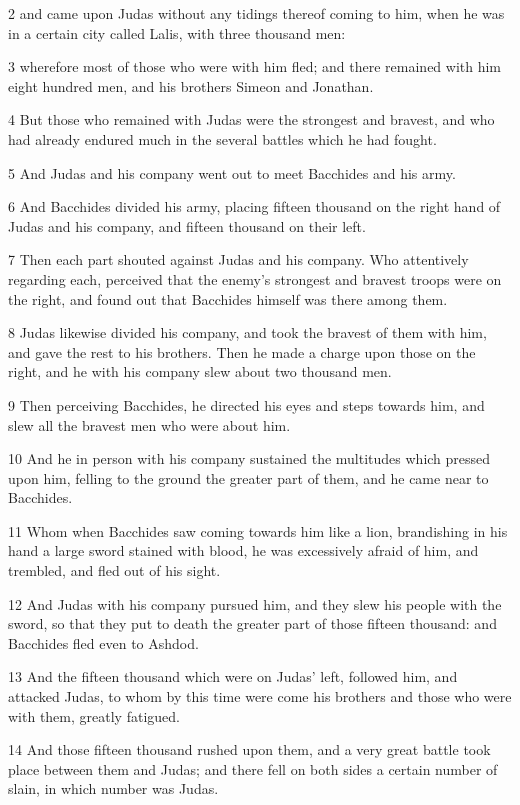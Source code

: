 2 and came upon Judas without any tidings thereof coming to him, when he was in a certain city called Lalis, with three thousand men: 

3 wherefore most of those who were with him fled; and there remained with him eight hundred men, and his brothers Simeon and Jonathan. 

4 But those who remained with Judas were the strongest and bravest, and who had already endured much in the several battles which he had fought. 

5 And Judas and his company went out to meet Bacchides and his army. 

6 And Bacchides divided his army, placing fifteen thousand on the right hand of Judas and his company, and fifteen thousand on their left. 

7 Then each part shouted against Judas and his company. Who attentively regarding each, perceived that the enemy’s strongest and bravest troops were on the right, and found out that Bacchides himself was there among them. 

8 Judas likewise divided his company, and took the bravest of them with him, and gave the rest to his brothers. Then he made a charge upon those on the right, and he with his company slew about two thousand men. 

9 Then perceiving Bacchides, he directed his eyes and steps towards him, and slew all the bravest men who were about him. 

10 And he in person with his company sustained the multitudes which pressed upon him, felling to the ground the greater part of them, and he came near to Bacchides. 

11 Whom when Bacchides saw coming towards him like a lion, brandishing in his hand a large sword stained with blood, he was excessively afraid of him, and trembled, and fled out of his sight. 

12 And Judas with his company pursued him, and they slew his people with the sword, so that they put to death the greater part of those fifteen thousand: and Bacchides fled even to Ashdod. 

13 And the fifteen thousand which were on Judas’ left, followed him, and attacked Judas, to whom by this time were come his brothers and those who were with them, greatly fatigued. 

14 And those fifteen thousand rushed upon them, and a very great battle took place between them and Judas; and there fell on both sides a certain number of slain, in which number was Judas. 

